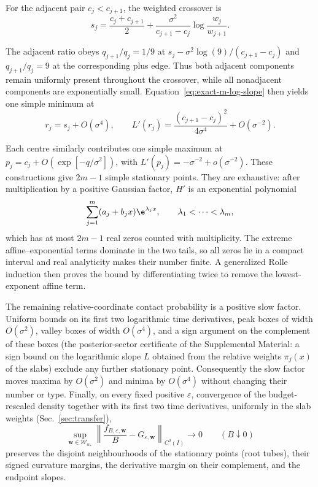 For the adjacent pair $c_j<c_{j+1}$, the weighted crossover is
\begin{equation}
 s_j=\frac{c_j+c_{j+1}}{2}
 +\frac{\sigma^2}{c_{j+1}-c_j}
  \log\!\frac{w_j}{w_{j+1}}.
 \label{eq:exact-m-crossover}
\end{equation}

The adjacent ratio obeys
$q_{j+1}/q_j=1/9$ at
$s_j-\sigma^2\log(9)/(c_{j+1}-c_j)$ and $q_{j+1}/q_j=9$ at the corresponding
plus edge.  Thus both adjacent components remain uniformly present throughout
the crossover, while all nonadjacent components are exponentially small.
Equation~\eqref{eq:exact-m-log-slope} then yields one simple minimum at
\begin{equation}
 r_j=s_j+O(\sigma^4),
 \qquad
 L'(r_j)=\frac{(c_{j+1}-c_j)^2}{4\sigma^4}
          +O(\sigma^{-2}).
 \label{eq:exact-m-valley}
\end{equation}

Each centre similarly contributes one simple maximum at
$p_j=c_j+O(\exp[-q/\sigma^2])$, with
$L'(p_j)=-\sigma^{-2}+o(\sigma^{-2})$.  These constructions give
$2m-1$ simple stationary points.  They are exhaustive: after multiplication
by a positive Gaussian factor, $H'$ is an exponential polynomial
\begin{equation}
 \sum_{j=1}^{m}(a_j+b_jx)\e^{\lambda_jx},
 \qquad \lambda_1<\cdots<\lambda_m,
 \label{eq:exact-m-exp-polynomial}
\end{equation}
which has at most $2m-1$ real zeros counted with multiplicity.  The extreme
affine--exponential terms dominate in the two tails, so all zeros lie in a
compact interval and real analyticity makes their number finite.  A
generalized Rolle induction then proves the bound by differentiating twice to
remove the lowest-exponent affine term.

The remaining relative-coordinate contact probability is a positive slow
factor.  Uniform bounds on its first two logarithmic time derivatives, peak
boxes of width $O(\sigma^2)$, valley boxes of width $O(\sigma^4)$, and a
sign argument on the complement of these boxes (the posterior-sector
certificate of the Supplemental Material: a sign bound on the logarithmic
slope $L$ obtained from the relative weights $\pi_j(x)$ of the slabs)
exclude any further stationary point.  Consequently the slow factor moves maxima by $O(\sigma^2)$ and
minima by $O(\sigma^4)$ without changing their number or type.  Finally, on
every fixed positive $\varepsilon$, convergence of the budget-rescaled
density together with its first two time derivatives, uniformly in the slab
weights (Sec.~\ref{sec:transfer}),
\begin{equation}
 \sup_{\bm w\in\mathcal W_{w_*}}
 \left\|\frac{f_{B,\varepsilon,\bm w}}{B}
       -G_{\varepsilon,\bm w}\right\|_{C^2(I)}
 \longrightarrow0
 \qquad (B\downarrow0)
 \label{eq:exact-m-weak-budget}
\end{equation}
preserves the disjoint neighbourhoods of the stationary points (root
tubes), their signed curvature margins, the derivative margin on their
complement, and the endpoint slopes.

